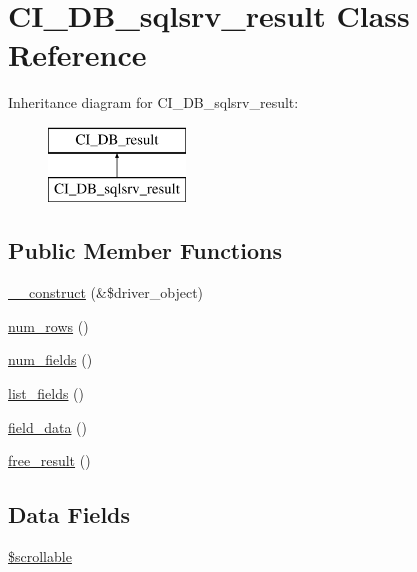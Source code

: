 \hypertarget{class_c_i___d_b__sqlsrv__result}{}\section{C\+I\+\_\+\+D\+B\+\_\+sqlsrv\+\_\+result Class Reference}
\label{class_c_i___d_b__sqlsrv__result}
Inheritance diagram for C\+I\+\_\+\+D\+B\+\_\+sqlsrv\+\_\+result\+:\begin{figure}[H]
\begin{center}
\leavevmode
\includegraphics[height=2.000000cm]{class_c_i___d_b__sqlsrv__result}
\end{center}
\end{figure}
\subsection*{Public Member Functions}
\begin{DoxyCompactItemize}
\item 
\mbox{\hyperlink{class_c_i___d_b__sqlsrv__result_a8e093c8b6e5733bc3f306385ee426ab7}{\+\_\+\+\_\+construct}} (\&\$driver\+\_\+object)
\item 
\mbox{\hyperlink{class_c_i___d_b__sqlsrv__result_a218657c303ee499b97710ab0cd2f5d6e}{num\+\_\+rows}} ()
\item 
\mbox{\hyperlink{class_c_i___d_b__sqlsrv__result_af831bf363e4d7d661a717a4932af449d}{num\+\_\+fields}} ()
\item 
\mbox{\hyperlink{class_c_i___d_b__sqlsrv__result_a50b54eb4ea7cfd039740f532988ea776}{list\+\_\+fields}} ()
\item 
\mbox{\hyperlink{class_c_i___d_b__sqlsrv__result_a84bffd65e53902ade1591716749a33e3}{field\+\_\+data}} ()
\item 
\mbox{\hyperlink{class_c_i___d_b__sqlsrv__result_aad2d98d6beb3d6095405356c6107b473}{free\+\_\+result}} ()
\end{DoxyCompactItemize}
\subsection*{Data Fields}
\begin{DoxyCompactItemize}
\item 
\mbox{\hyperlink{class_c_i___d_b__sqlsrv__result_a76095eacf021915db9aabc44ecf58555}{\$scrollable}}
\end{DoxyCompactItemize}
